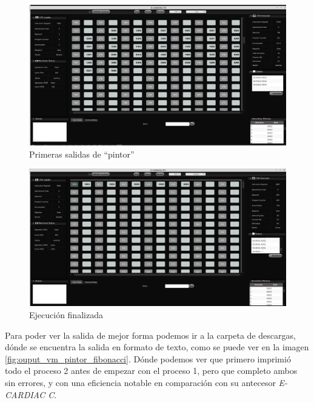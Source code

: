 \documentclass[letterpaper,12pt,oneside]{book}
\begin{document}
			
			
			\begin{figure}[h]		
				\centering
				\includegraphics[scale=0.26]{media/Paralela/vm_starting_to_print_pintor.png}
				\caption{Primeras salidas de ``pintor''}
				\label{fig:vm_starting_to_print_pintor}
			\end{figure}	
			
			
			\begin{figure}[h]		
				\centering
				\includegraphics[scale=0.26]{media/Paralela/vm_finish_the_execution.png}
				\caption{Ejecución finalizada}
				\label{fig:vm_finish_the_execution}
			\end{figure}	
			
			Para poder ver la salida de mejor forma podemos ir a la carpeta de descargas, dónde se encuentra la salida en formato
			de texto, como se puede ver en la imagen \ref{fig:ouput_vm_pintor_fibonacci}. Dónde podemos ver que primero imprimió todo
			el proceso 2 antes de empezar con el proceso 1, pero que completo ambos sin errores, y con una eficiencia notable en comparación
			con su antecesor \textit{E-CARDIAC C}.
			
\end{document}

